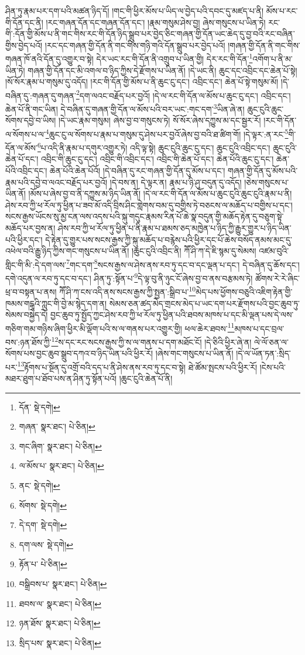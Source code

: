 ཤིན་ཏུ་རྣམ་པར་དག་པའི་མཚན་ཉིད་དོ། །གང་གི་ཕྱིར་མོས་པ་ཡིད་ལ་བྱེད་པའི་དབང་དུ་མཛད་པ་ནི། མོས་པ་རང་གི་དོན་དང་ནི། །རང་གཞན་དོན་དང་གཞན་དོན་དང་། །རྣམ་གསུམ་ཤེས་བྱ། ཞེས་གསུངས་པ་ཡིན་ཏེ། རང་གི་:དོན་གྱི་མོས་པ་ནི་གང་གིས་རང་གི་དོན་ཉིད་སྒྲུབ་པར་བྱེད་ཅིང་གཞན་གྱི་དོན་ཡང་ཆེད་དུ་བྱ་བའི་རང་བཞིན་གྱིས་བྱེད་པའོ། །རང་དང་གཞན་གྱི་དོན་ནི་གང་གིས་གཉི་གའི་དོན་སྒྲུབ་པར་བྱེད་པའོ། །གཞན་གྱི་དོན་ནི་གང་གིས་གཞན་ཁོ་ནའི་དོན་དུ་འགྱུར་བ་སྟེ། དེར་ཡང་རང་གི་དོན་ནི་འགྲུབ་པ་ཡིན་གྱི། དེར་རང་གི་དོན་\footnote{དོན་  སྡེ་དགེ། }འགོག་པ་ནི་མ་ཡིན་ཏེ། གཞན་གྱི་དོན་དང་མི་འགལ་བ་ཉིད་ཀྱིས་དེ་རྫོགས་པ་ཡིན་ནོ། །དེ་ཡང་ནི། ཆུང་དང་འབྲིང་དང་ཆེན་པོ་སྟེ། །སོ་སོར་རྣམ་པ་གསུམ་དུ་འདོད། །རང་གི་དོན་གྱི་མོས་པ་ནི་ཆུང་ངུ་དང་། འབྲིང་དང་། ཆེན་པོ་སྟེ་གསུམ་མོ། །དེ་བཞིན་དུ་:གཞན་དུ་གཞན་\footnote{གཞན་  སྣར་ཐང་།  པེ་ཅིན། }དག་ལའང་བརྗོད་པར་བྱའོ། །དེ་ལ་རང་གི་དོན་ལ་མོས་པ་ཆུང་ངུ་དང་། འབྲིང་དང་། ཆེན་པོ་ནི་གང་ཡིན། དེ་བཞིན་དུ་གཞན་གྱི་དོན་ལ་མོས་པའི་བར་ཡང་:གང་དག་\footnote{གང་ཞིག་  སྣར་ཐང་།  པེ་ཅིན། }ཡིན་ཞེ་ན། ཆུང་ངུའི་ཆུང་སོགས་དབྱེ་བ་ཡིས། །དེ་ཡང་རྣམ་གསུམ། ཞེས་བྱ་བ་གསུངས་ཏེ། སོ་སོར་ཞེས་དཀྱུས་མ་དང་སྦྱར་རོ། །རང་གི་དོན་ལ་སོགས་པ་ལ་\footnote{ལ་མོས་པ་  སྣར་ཐང་།  པེ་ཅིན། }ཆུང་ངུ་ལ་སོགས་པ་རྣམ་པ་གསུམ་དུ་ཤེས་པར་བྱའོ་ཞེས་བྱ་བའི་ཐ་ཚིག་གོ། །དེ་ལྟར་:ན་རང་\footnote{ནང་  སྡེ་དགེ། }གི་དོན་ལ་མོས་\footnote{སོགས་  སྡེ་དགེ། }པ་འདི་ནི་རྣམ་པ་དགུར་འགྱུར་ཏེ། འདི་ལྟ་སྟེ། ཆུང་ངུའི་ཆུང་ངུ་དང་། ཆུང་ངུའི་འབྲིང་དང་། ཆུང་ངུའི་ཆེན་པོ་དང་། འབྲིང་གི་ཆུང་ངུ་དང་། འབྲིང་གི་འབྲིང་དང་། འབྲིང་གི་ཆེན་པོ་དང་། ཆེན་པོའི་ཆུང་ངུ་དང་། ཆེན་པོའི་འབྲིང་དང་། ཆེན་པོའི་ཆེན་པོའོ། །དེ་བཞིན་དུ་རང་གཞན་གྱི་དོན་དུ་མོས་པ་དང་། གཞན་གྱི་དོན་དུ་མོས་པའི་རྣམ་པའི་དབྱེ་བ་ལའང་བརྗོད་པར་བྱའོ། །དེ་བས་ན། དེ་ལྟར་ན། རྣམ་པ་ཉི་ཤུ་བདུན་དུ་འདོད། །ཅེས་གསུངས་པ་ཡིན་ནོ། །མོས་པ་ཞེས་བྱ་བ་ནི་དཀྱུས་མ་ཉིད་ཡིན་ནོ། །དེ་ལ་རང་གི་དོན་ལ་མོས་པ་ཆུང་ངུའི་ཆུང་ངུའི་རྣམ་པ་ནི། ཤེས་རབ་ཀྱི་ཕ་རོལ་ཏུ་ཕྱིན་པ་ཟབ་མོ་འདི་བྲིས་ཤིང་གླེགས་བམ་དུ་བགྱིས་ཏེ་བཅངས་ལ་མཆོད་པ་བགྱིས་པ་དང་། སངས་རྒྱས་ཡོངས་སུ་མྱ་ངན་ལས་འདས་པའི་སྐུ་གདུང་རྣམས་རིན་པོ་ཆེ་སྣ་བདུན་གྱི་མཆོད་རྟེན་དུ་བཅུག་སྟེ་མཆོད་པར་བྱས་ན། ཤེས་རབ་ཀྱི་ཕ་རོལ་ཏུ་ཕྱིན་པ་ནི་རྣམ་པ་ཐམས་ཅད་མཁྱེན་པ་ཉིད་ཀྱི་རྒྱུར་གྱུར་པ་ཉིད་ཡིན་པའི་ཕྱིར་དང་། དེ་རྟེན་དུ་གྱུར་པས་སངས་རྒྱས་ཀྱི་སྐུ་མཆོད་པ་བརྙེས་པའི་ཕྱིར་དང་པོ་ཆེས་བསོད་ནམས་མང་དུ་འཕེལ་བའི་རྒྱུ་ཉིད་ཀྱིས་གང་གསུངས་པ་ཡིན་ནོ། །ཆུང་ངུའི་འབྲིང་ནི། ཀཽ་ཤི་ཀ་དེ་ཇི་སྙམ་དུ་སེམས། འཛམ་བུའི་གླིང་གི་མི་:དེ་དག་ལས་\footnote{དེ་དག་  སྡེ་དགེ། }གང་དག་\footnote{དག་ལས་  སྡེ་དགེ། }སངས་རྒྱས་ལ་ཤེས་ནས་རབ་ཏུ་དང་བ་དང་ལྡན་པ་དང་། དེ་བཞིན་དུ་ཆོས་དང་། དགེ་འདུན་ལ་རབ་ཏུ་དང་བ་དང་། ཤིན་ཏུ་:སྟོན་པ་\footnote{རྟོན་པ་  པེ་ཅིན། }དེ་ལྟ་བུ་ནི་ཉུང་ངོ་ཞེས་བྱ་བ་ནས་བརྩམས་ཏེ། ཚོགས་རེ་རེ་ཞིང་ཕྲ་བ་བསྟན་པ་ནས། ཀཽ་ཤི་ཀ་ངས་འདི་ནས་སངས་རྒྱས་ཀྱི་སྤྱན་:སྒྲིབ་པ་\footnote{བསྒྲིབས་པ་  སྣར་ཐང་།  པེ་ཅིན། }མེད་པས་ཕྱོགས་བཅུའི་འཇིག་རྟེན་གྱི་ཁམས་གངྒཱའི་ཀླུང་གི་བྱེ་མ་སྙེད་དག་ན། སེམས་ཅན་ཚད་མེད་གྲངས་མེད་པ་ཡང་དག་པར་རྫོགས་པའི་བྱང་ཆུབ་ཏུ་སེམས་བསྐྱེད་དེ། བྱང་ཆུབ་ཏུ་སྤྱོད་ཀྱང་ཤེས་རབ་ཀྱི་ཕ་རོལ་ཏུ་ཕྱིན་པའི་ཐབས་མཁས་པ་དང་མི་ལྡན་པས་དེ་ལས་གཅིག་གམ་གཉིས་ཞིག་ཕྱིར་མི་ལྡོག་པའི་ས་ལ་གནས་པར་འགྱུར་གྱི། ཕལ་ཆེར་ཐབས་\footnote{ཐབས་ལ་  སྣར་ཐང་།  པེ་ཅིན། }མཁས་པ་དང་བྲལ་བས་:ཉན་ཐོས་ཀྱི་\footnote{ཉན་ཐོས་  སྣར་ཐང་།  པེ་ཅིན། }ས་དང་རང་སངས་རྒྱས་ཀྱི་ས་ལ་གནས་པ་དག་མཐོང་ངོ། །དེ་ཅིའི་ཕྱིར་ཞེ་ན། ལེ་ལོ་ཅན་ལ་སོགས་པས་བྱང་ཆུབ་སྒྲུབ་དཀའ་བ་ཉིད་ཡིན་པའི་ཕྱིར་རོ། །ཞེས་གང་གསུངས་པ་ཡིན་ནོ། །དེ་ལ་ཡོན་ཏན་:སྲིད་པར་\footnote{སྲིད་པས་  སྣར་ཐང་།  པེ་ཅིན། }རྟོགས་པ་སྔོན་དུ་འགྲོ་བའི་དད་པ་ནི་ཤེས་ནས་རབ་ཏུ་དང་བ་སྟེ། ཐེ་ཚོམ་སྤངས་པའི་ཕྱིར་རོ། །ངེས་པའི་མཐར་ཐུག་པ་ཐོབ་པས་ན་ཤིན་ཏུ་སྟོན་པའོ། །ཆུང་ངུའི་ཆེན་པོ་ནི། 